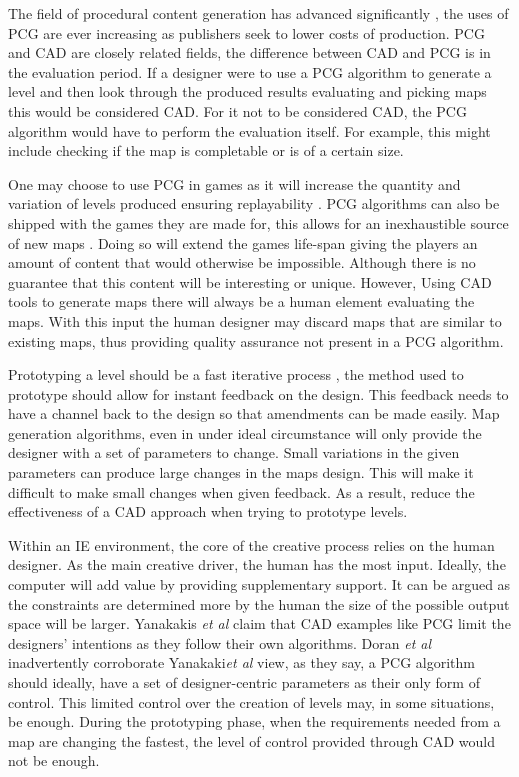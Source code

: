 \documentclass[journal]{IEEEtran}
\begin{document}
The field of procedural content generation has advanced significantly \cite{van2013designing}, the uses of PCG are ever increasing as publishers seek to lower costs of production\cite{doherty2005mixed, font2016constrained}. PCG and CAD are closely related fields, the difference between CAD and PCG is in the evaluation period. If a designer were to use a PCG algorithm to generate a level and then look through the produced results evaluating and picking maps this would be considered CAD\cite{liapis2016mixed}. For it not to be considered CAD, the PCG algorithm would have to perform the evaluation itself. For example, this might include checking if the map is completable or is of a certain size. 

One may choose to use PCG in games as it will increase the quantity and variation of levels produced ensuring replayability \cite{karavolos2015mixed}. PCG algorithms can also be shipped with the games they are made for, this allows for an inexhaustible source of new maps \cite{johnson2010cellular}. Doing so will extend the games life-span giving the players an amount of content that would otherwise be impossible. Although there is no guarantee that this content will be interesting or unique.  However, Using CAD tools to generate maps there will always be a human element evaluating the maps. With this input the human designer may discard maps that are similar to existing maps, thus providing quality assurance not present in a PCG algorithm.

Prototyping a level should be a fast iterative process \cite{smith2011tanagra}, the method used to prototype should allow for instant feedback on the design. This feedback needs to have a channel back to the design so that amendments can be made easily. Map generation algorithms, even in under ideal circumstance will only provide the designer with a set of parameters to change\cite{doran2010controlled}. Small variations in the given parameters can produce large changes in the maps design\cite{regier2009random}. This will make it difficult to make small changes when given feedback. As a result, reduce the effectiveness of a CAD approach when trying to prototype levels.

Within an IE environment, the core of the creative process relies on the human designer. As the main creative driver, the human has the most input. Ideally, the computer will add value by providing supplementary support. It can be argued as the constraints are determined more by the human the size of the possible output space will be larger. Yanakakis \textit{et al} \cite{yannakakis2014mixed} claim that CAD examples like PCG limit the designers' intentions as they follow their own algorithms. Doran \textit{et al}\cite{doran2010controlled} inadvertently corroborate Yanakaki\textit{et al}\cite{yannakakis2014mixed} view, as they say, a PCG algorithm should ideally, have a set of designer-centric parameters as their only form of control. This limited control over the creation of levels may, in some situations, be enough. During the prototyping phase, when the requirements needed from a map are changing the fastest, the level of control provided through CAD would not be enough. 
\end{document}
